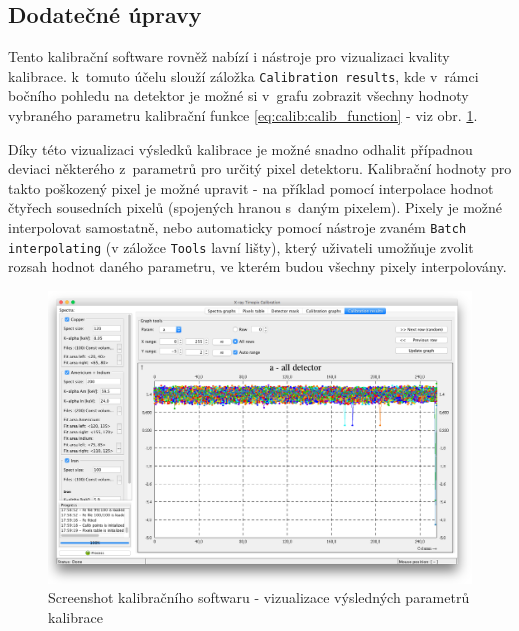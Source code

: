 \subsection{Dodatečné úpravy}\label{calib:sw:post_process}
Tento kalibrační software rovněž nabízí i nástroje pro vizualizaci kvality kalibrace. k~tomuto účelu slouží záložka \texttt{Calibration results}, kde v~rámci bočního pohledu na detektor je možné si v~grafu zobrazit všechny hodnoty vybraného parametru kalibrační funkce \ref{eq:calib:calib_function} - viz obr. \ref{fig:calib:sw_calib_results}.

Díky této vizualizaci výsledků kalibrace je možné snadno odhalit případnou deviaci některého z~parametrů pro určitý pixel detektoru. Kalibrační hodnoty pro takto poškozený pixel je možné upravit - na příklad pomocí interpolace hodnot čtyřech sousedních pixelů (spojených hranou s~daným pixelem). Pixely je možné interpolovat samostatně, nebo automaticky pomocí nástroje zvaném \texttt{Batch interpolating} (v záložce \texttt{Tools} lavní lišty), který uživateli umožňuje zvolit rozsah hodnot daného parametru, ve kterém budou všechny pixely interpolovány.

\begin{figure}[t]
	\begin{center}
		\includegraphics[width=16cm]{figures/calibsw_result.png}
		\caption{Screenshot kalibračního softwaru - vizualizace výsledných parametrů kalibrace}
		\label{fig:calib:sw_calib_results}
	\end{center}
\end{figure}









